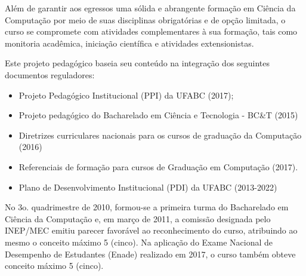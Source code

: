 Além de garantir aos egressos uma sólida e abrangente formação em Ciência da
Computação por meio de suas disciplinas obrigatórias e de opção limitada, o curso se compromete com atividades complementares à sua formação, tais como monitoria acadêmica, iniciação científica e atividades extensionistas.

Este projeto pedagógico baseia seu conteúdo na integração dos seguintes documentos reguladores:

\begin{itemize}
	\item Projeto Pedagógico Institucional (PPI) da UFABC (2017);
	\item Projeto pedagógico do Bacharelado em Ciência e Tecnologia - BC\&T (2015)
	\item Diretrizes curriculares nacionais para os cursos de graduação da Computação (2016)
	\item Referenciais de formação para cursos de Graduação em Computação (2017).
	\item Plano de Desenvolvimento Institucional (PDI) da UFABC (2013-2022)
\end{itemize}




No 3o. quadrimestre de 2010, formou-se a primeira turma do Bacharelado em Ciência da Computação e, em março de 2011, a comissão designada pelo INEP/MEC emitiu parecer favorável ao reconhecimento do curso, atribuindo ao mesmo o conceito máximo 5 (cinco).
Na aplicação do Exame Nacional de Desempenho de Estudantes (Enade) realizado em 2017, o curso também obteve conceito máximo 5 (cinco).
